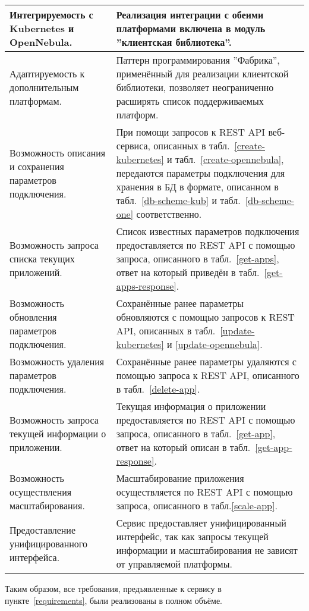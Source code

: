 \begin{xltabular}{\textwidth}{p{0.25\textwidth} X}
    Интегрируемость с Kubernetes и OpenNebula. & Реализация интеграции с обеими платформами включена в модуль ''клиентская библиотека''. \\
    \hline
    Адаптируемость к дополнительным платформам. & Паттерн программирования ''Фабрика'', применённый для реализации клиентской библиотеки, позволяет неограниченно расширять список поддерживаемых платформ. \\
    \hline
    Возможность описания и сохранения параметров подключения. & При помощи запросов к REST API веб-сервиса, описанных в табл.~\ref{create-kubernetes} и табл.~\ref{create-opennebula}, передаются параметры подключения для хранения в БД в формате, описанном в табл.~\ref{db-scheme-kub} и табл.~\ref{db-scheme-one} соответственно. \\
    \hline
    Возможность запроса списка текущих приложений. & Список известных параметров подключения предоставляется по REST API с помощью запроса, описанного в табл.~\ref{get-apps}, ответ на который приведён в табл.~\ref{get-apps-response}. \\
    \hline
    Возможность обновления параметров подключения. & Сохранённые ранее параметры обновляются с помощью запросов к REST API, описанных в табл.~\ref{update-kubernetes} и \ref{update-opennebula}. \\
    \hline
    Возможность удаления параметров подключения. & Сохранённые ранее параметры удаляются с помощью запроса к REST API, описанного в табл.~\ref{delete-app}. \\
    \hline
    Возможность запроса текущей информации о приложении. & Текущая информация о приложении предоставляется по REST API с помощью запроса, описанного в табл.~\ref{get-app}, ответ на который описан в табл.~\ref{get-app-response}. \\
    \hline
    Возможность осуществления масштабирования. & Масштабирование приложения осуществляется по REST API с помощью запроса, описанного в табл.\ref{scale-app}. \\
    \hline
    Предоставление унифицированного интерфейса. & Сервис предоставляет унифицированный интерфейс, так как запросы текущей информации и масштабирования не зависят от управляемой платформы. \\
\end{xltabular}

Таким образом, все требования, предъявленные к сервису в пункте~\ref{requirements}, были реализованы в полном объёме.
